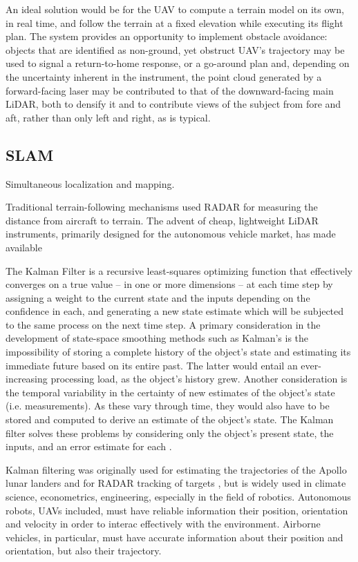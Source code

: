 \documentclass[10pt,a4paper]{report}
\begin{document}
An ideal solution would be for the UAV to compute a terrain model on its own, in real time, and follow the terrain at a fixed elevation while executing its flight plan. The system provides an opportunity to implement obstacle avoidance: objects that are identified as non-ground, yet obstruct UAV’s trajectory may be used to signal a return-to-home response, or a go-around plan and, depending on the uncertainty inherent in the instrument, the point cloud generated by a forward-facing laser may be contributed to that of the downward-facing main LiDAR, both to densify it and to contribute views of the subject from fore and aft, rather than only left and right, as is typical. 



\subsection{SLAM}

Simultaneous localization and mapping.

Traditional terrain-following mechanisms used RADAR for measuring the distance from aircraft to terrain. The advent of cheap, lightweight LiDAR instruments, primarily designed for the autonomous vehicle market, has made available 


The Kalman Filter \cite{Kalman1960} is a recursive least-squares optimizing function that effectively converges on a true value -- in one or more dimensions -- at each time step by assigning a weight to the current state and the inputs depending on the confidence in each, and generating a new state estimate which will be subjected to the same process on the next time step. A primary consideration in the development of state-space smoothing methods such as Kalman's is the impossibility of storing a complete history of the object's state and estimating its immediate future based on its entire past. The latter would entail an ever-increasing processing load, as the object's history grew. Another consideration is the temporal variability in the certainty of new estimates of the object's state (i.e. measurements). As these vary through time, they would also have to be stored and computed to derive an estimate of the object's state. The Kalman filter solves these problems by considering only the object's present state, the inputs, and an error estimate for each \cite{Swerling1959}. 

Kalman filtering was originally used for estimating the trajectories of the Apollo lunar landers and for RADAR tracking of targets \cite{Grewal2010}, but is widely used in climate science, econometrics, engineering, especially in the field of robotics. Autonomous robots, UAVs included, must have reliable information their position, orientation and velocity in order to interac effectively with the environment. Airborne vehicles, in particular, must have accurate information about their position and orientation, but also their trajectory.
\end{document}
